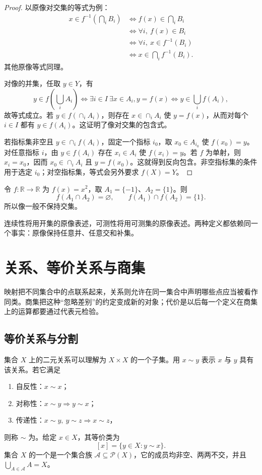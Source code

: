 \begin{proof}
以原像对交集的等式为例：
\[
\begin{aligned}
x\in f^{-1}\left(\bigcap_i B_i\right)
&\Leftrightarrow f(x)\in\bigcap_i B_i\\
&\Leftrightarrow \forall i,\ f(x)\in B_i\\
&\Leftrightarrow \forall i,\ x\in f^{-1}(B_i)\\
&\Leftrightarrow x\in\bigcap_i f^{-1}(B_i).
\end{aligned}
\]
其他原像等式同理。

对像的并集，任取 \(y\in Y\)，有
\[
  y\in f\left(\bigcup_i A_i\right)
  \Leftrightarrow \exists i\in I\ \exists x\in A_i, y=f(x)
  \Leftrightarrow y\in\bigcup_i f(A_i),
\]
故等式成立。若 \(y\in f(\cap_i A_i)\)，则存在 \(x\in\cap_i A_i\) 使 \(y=f(x)\)，从而对每个 \(i\in I\) 都有 \(y\in f(A_i)\)。这证明了像对交集的包含式。

若指标集非空且 \(y\in\cap_i f(A_i)\)，固定一个指标 \(i_0\)，取 \(x_0\in A_{i_0}\) 使 \(f(x_0)=y\)。对任意指标 \(i\)，由 \(y\in f(A_i)\) 存在 \(x_i\in A_i\) 使 \(f(x_i)=y\)。若 \(f\) 为单射，则 \(x_i=x_0\)，因而 \(x_0\in\cap_i A_i\) 且 \(y=f(x_0)\)。这就得到反向包含。非空指标集的条件用于选定 \(i_0\)；对空指标集，等式会另外要求 \(f(X)=Y\)。
\end{proof}

\begin{counterexample}
令 \(f:\mathbb R\to\mathbb R\) 为 \(f(x)=x^2\)，取 \(A_1=\{-1\}\)、\(A_2=\{1\}\)。则
\[
  f(A_1\cap A_2)=\varnothing,\qquad
  f(A_1)\cap f(A_2)=\{1\}.
\]
所以像一般不保持交集。
\end{counterexample}

连续性将用开集的原像表述，可测性将用可测集的原像表述。两种定义都依赖同一个事实：原像保持任意并、任意交和补集。

\section{关系、等价关系与商集}

映射把不同集合中的点联系起来，关系则允许在同一集合中声明哪些点应当被看作同类。商集把这种“忽略差别”的约定变成新的对象；代价是以后每一个定义在商集上的运算都要通过代表元检验。

\subsection{等价关系与分割}

集合 \(X\) 上的二元关系可以理解为 \(X\times X\) 的一个子集。用 \(x\sim y\) 表示 \(x\) 与 \(y\) 具有该关系。若它满足
\begin{enumerate}
  \item 自反性：\(x\sim x\)；
  \item 对称性：\(x\sim y\Rightarrow y\sim x\)；
  \item 传递性：\(x\sim y,\ y\sim z\Rightarrow x\sim z\)，
\end{enumerate}
则称 \(\sim\) 为。给定 \(x\in X\)，其等价类为
\[
  [x]=\{y\in X:y\sim x\}.
\]
集合 \(X\) 的一个是一个集合族 \(\mathcal A\subseteq\mathcal P(X)\)，它的成员均非空、两两不交，并且 \(\bigcup_{A\in\mathcal A}A=X\)。

